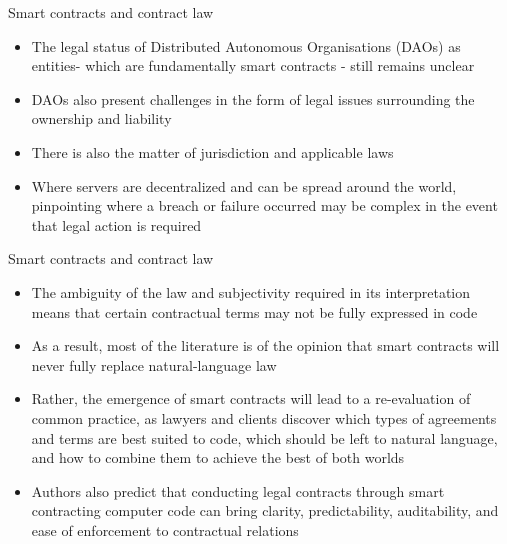 \documentclass[10pt]{beamer}
\begin{document}
\begin{frame}{Smart contracts and contract law}
	\begin{itemize}
		\item The legal status of Distributed Autonomous Organisations (DAOs) as entities- which are fundamentally smart contracts - still remains unclear
		\item DAOs also present challenges in the form of legal issues surrounding the ownership and liability
		\item There is also the matter of jurisdiction and applicable laws
		\item Where servers are decentralized and can be spread around the world, pinpointing where a breach or failure occurred may be complex in the event that legal action is required
	\end{itemize}
\end{frame}



\begin{frame}{Smart contracts and contract law}
	\begin{itemize}
		\item The ambiguity of the law and subjectivity required in its interpretation means that certain contractual terms may not be fully expressed in code
		\item As a result, most of the literature is of the opinion that smart contracts will never fully replace natural-language law
		\item Rather, the emergence of smart contracts will lead to a re-evaluation of common practice, as lawyers and clients discover which types of agreements and terms are best suited to code, which should be left to natural language, and how to combine them to achieve the best of both worlds
		\item Authors also predict that conducting legal contracts through smart contracting computer code can bring clarity, predictability, auditability, and ease of enforcement to contractual relations
	\end{itemize}
\end{frame}
\end{document}
